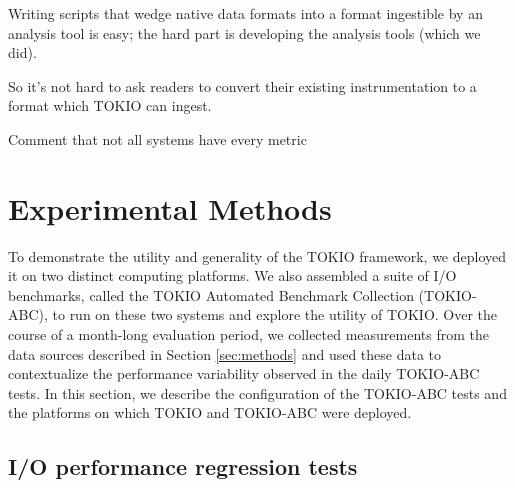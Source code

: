 Writing scripts that wedge native data formats into a format ingestible by an analysis tool is easy; the hard part is developing the analysis tools (which we did).

So it's not hard to ask readers to convert their existing instrumentation to a format which TOKIO can ingest.

Comment that not all systems have every metric

\section{Experimental Methods} \label{sec:platforms}

To demonstrate the utility and generality of the TOKIO framework, we deployed it on two distinct computing platforms.
We also assembled a suite of I/O benchmarks, called the TOKIO Automated Benchmark Collection (TOKIO-ABC), to run on these two systems and explore the utility of TOKIO.  
Over the course of a month-long evaluation period, we collected measurements from the data sources described in Section \ref{sec:methods} and used these data to contextualize the performance variability observed in the daily TOKIO-ABC tests.
In this section, we describe the configuration of the TOKIO-ABC tests and the platforms on which TOKIO and TOKIO-ABC were deployed.

\subsection{I/O performance regression tests} \label{sec:methods/tests}

